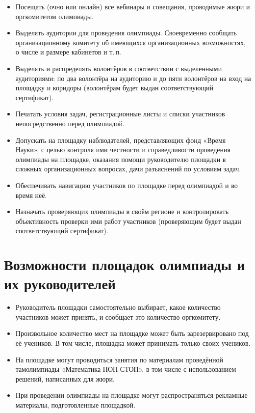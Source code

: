 \documentclass[a4paper,12pt]{article}
\newcommand{\mns}{«Математика НОН-СТОП»\xspace}
\begin{document}
\begin{itemize}
	\item Посещать (очно или онлайн) все вебинары и совещания, проводимые жюри и оргкомитетом олимпиады.
	\item Выделять аудитории для проведения олимпиады. Своевременно сообщать организационному комитету об имеющихся организационных возможностях, о числе и размере кабинетов и т.\,п.
	\item Выделять и распределять волонтёров в соответствии с выделенными аудиториями: по два волонтёра на аудиторию и до пяти волонтёров на вход на площадку и коридоры (волонтёрам будет выдан соответствующий сертификат).
	\item Печатать условия задач, регистрационные листы и списки участников непосредственно перед олимпиадой.
	\item Допускать на площадку наблюдателей, представляющих фонд «Время Науки», с целью контроля ими честности и справедливости проведения олимпиады на площадке, оказания помощи руководителю площадки в сложных организационных вопросах, дачи разъяснений по условиям задач.
	\item Обеспечивать навигацию участников по площадке перед олимпиадой и во время неё.
	\item Назначать проверяющих олимпиады в своём регионе и контролировать объективность проверки ими работ участников (проверяющим будет выдан соответствующий сертификат).
\end{itemize}

\section{Возможности площадок олимпиады и их руководителей}

\begin{itemize}
	\item Руководитель площадки самостоятельно выбирает, какое количество участников может принять, и сообщает это количество оргкомитету.
	\item Произвольное количество мест на площадке может быть зарезервировано под её учеников. В том числе, площадка может принимать только своих учеников.
	\item На площадке могут проводиться занятия по материалам проведённой там\linebreak олимпиады \mns, в том числе с использованием решений, написанных для жюри.
	\item При проведении олимпиады на площадке могут распространяться рекламные материалы, подготовленные площадкой.
\end{itemize}
\end{document}

